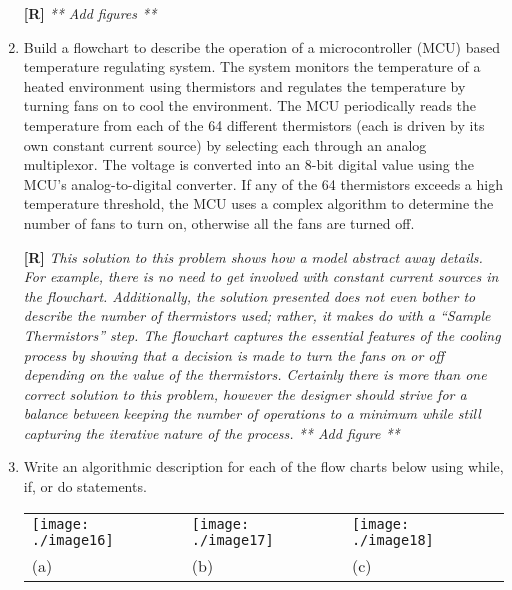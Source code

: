 \begin{enumerate}
    \begin{onlysolution}
      \textbf{[R]}
      \itshape
      ** Add figures **
    \end{onlysolution}

  \item
    Build a flowchart to describe the operation of a microcontroller
    (MCU) based temperature regulating system. The system monitors the
    temperature of a heated environment using thermistors and regulates
    the temperature by turning fans on to cool the environment. The MCU
    periodically reads the temperature from each of the 64 different
    thermistors (each is driven by its own constant current source) by
    selecting each through an analog multiplexor. The voltage is
    converted into an 8-bit digital value using the MCU's
    analog-to-digital converter. If any of the 64 thermistors exceeds a
    high temperature threshold, the MCU uses a complex algorithm to
    determine the number of fans to turn on, otherwise all the fans are
    turned off.

    \begin{onlysolution}
      \textbf{[R]}
      \itshape
      This solution to this problem shows how a model abstract away details. 
      For example, there is no need to get involved with constant current 
      sources in the flowchart. Additionally, the solution presented does not 
      even bother to describe the number of thermistors used; rather, it makes 
      do with a “Sample Thermistors” step. The flowchart captures the essential 
      features of the cooling process by showing that a decision is made to turn 
      the fans on or off depending on the value of the thermistors. Certainly 
      there is more than one correct solution to this problem, however the designer 
      should strive for a balance between keeping the number of operations to a 
      minimum while still capturing the iterative nature of the process.
      ** Add figure ** 
    \end{onlysolution}

  \item
    Write an algorithmic description for each of the flow charts below
    using while, if, or do statements.

    \begin{tabular}{m{4cm}m{4cm}m{4cm}}
    \texttt{[image: ./image16]} &
    \texttt{[image: ./image17]} &
    \texttt{[image: ./image18]} \\
    (a) &  (b)  & (c) \\
    \end{tabular}


\end{enumerate}
